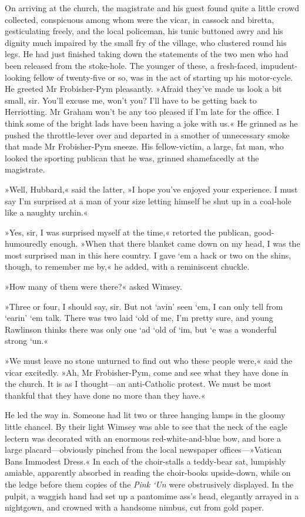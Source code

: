 On arriving at the church, the magistrate and his guest found quite a little crowd collected, conspicuous among whom were the vicar, in cassock and biretta, gesticulating freely, and the local policeman, his tunic buttoned awry and his dignity much impaired by the small fry of the village, who clustered round his legs. He had just finished taking down the statements of the two men who had been released from the stoke-hole. The younger of these, a fresh-faced, impudent-looking fellow of twenty-five or so, was in the act of starting up his motor-cycle. He greeted Mr Frobisher-Pym pleasantly. »Afraid they've made us look a bit small, sir. You'll excuse me, won't you? I'll have to be getting back to Herriotting. Mr Graham won't be any too pleased if I'm late for the office. I think some of the bright lads have been having a joke with us.« He grinned as he pushed the throttle-lever over and departed in a smother of unnecessary smoke that made Mr Frobisher-Pym sneeze. His fellow-victim, a large, fat man, who looked the sporting publican that he was, grinned shamefacedly at the magistrate.

»Well, Hubbard,« said the latter, »I hope you've enjoyed your experience. I must say I'm surprised at a man of your size letting himself be shut up in a coal-hole like a naughty urchin.«

»Yes, sir, I was surprised myself at the time,« retorted the publican, good-humouredly enough. »When that there blanket came down on my head, I was the most surprised man in this here country. I gave `em a hack or two on the shins, though, to remember me by,« he added, with a reminiscent chuckle.

»How many of them were there?« asked Wimsey.

»Three or four, I should say, sir. But not `avin' seen `em, I can only tell from `earin' `em talk. There was two laid `old of me, I'm pretty sure, and young Rawlinson thinks there was only one `ad `old of `im, but `e was a wonderful strong `un.«

»We must leave no stone unturned to find out who these people were,« said the vicar excitedly. »Ah, Mr Frobisher-Pym, come and see what they have done in the church. It is as I thought—an anti-Catholic protest. We must be most thankful that they have done no more than they have.«

He led the way in. Someone had lit two or three hanging lamps in the gloomy little chancel. By their light Wimsey was able to see that the neck of the eagle lectern was decorated with an enormous red-white-and-blue bow, and bore a large placard—obviously pinched from the local newspaper offices—»Vatican Bans Immodest Dress.« In each of the choir-stalls a teddy-bear sat, lumpishly amiable, apparently absorbed in reading the choir-books upside-down, while on the ledge before them copies of the \textit{Pink `Un} were obstrusively displayed. In the pulpit, a waggish hand had set up a pantomime ass's head, elegantly arrayed in a nightgown, and crowned with a handsome nimbus, cut from gold paper.

